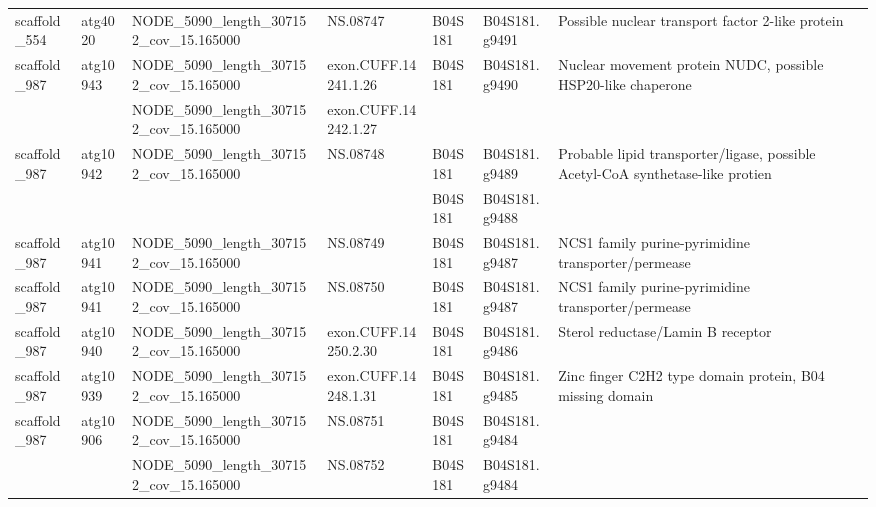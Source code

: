 \begin{longtable}{lllllll}
   scaffold\_554 &   atg4020 &   NODE\_5090\_length\_307152\_cov\_15.165000 &              NS.08747 &      B04S181 &   B04S181.g9491 &                                Possible nuclear transport factor 2-like protein \\
   scaffold\_987 &  atg10943 &   NODE\_5090\_length\_307152\_cov\_15.165000 &  exon.CUFF.14241.1.26 &      B04S181 &   B04S181.g9490 &                    Nuclear movement protein NUDC, possible HSP20-like chaperone \\
                &           &    NODE\_5090\_length\_307152\_cov\_15.165000 &  exon.CUFF.14242.1.27 &              &                 &                                                                                 \\
   scaffold\_987 &  atg10942 &   NODE\_5090\_length\_307152\_cov\_15.165000 &              NS.08748 &      B04S181 &   B04S181.g9489 &  Probable lipid transporter/ligase, possible Acetyl-CoA synthetase-like protien \\
                &           &                                              &                       &      B04S181 &   B04S181.g9488 &                                                                                 \\
   scaffold\_987 &  atg10941 &   NODE\_5090\_length\_307152\_cov\_15.165000 &              NS.08749 &      B04S181 &   B04S181.g9487 &                              NCS1 family purine-pyrimidine transporter/permease \\
   scaffold\_987 &  atg10941 &   NODE\_5090\_length\_307152\_cov\_15.165000 &              NS.08750 &      B04S181 &   B04S181.g9487 &                              NCS1 family purine-pyrimidine transporter/permease \\
   scaffold\_987 &  atg10940 &   NODE\_5090\_length\_307152\_cov\_15.165000 &  exon.CUFF.14250.2.30 &      B04S181 &   B04S181.g9486 &                                               Sterol reductase/Lamin B receptor \\
   scaffold\_987 &  atg10939 &   NODE\_5090\_length\_307152\_cov\_15.165000 &  exon.CUFF.14248.1.31 &      B04S181 &   B04S181.g9485 &                        Zinc finger C2H2 type domain protein, B04 missing domain \\
   scaffold\_987 &  atg10906 &   NODE\_5090\_length\_307152\_cov\_15.165000 &              NS.08751 &      B04S181 &   B04S181.g9484 &                                                                                 \\
                &           &   NODE\_5090\_length\_307152\_cov\_15.165000 &              NS.08752 &      B04S181 &   B04S181.g9484 &                                                                                 \\
\end{longtable}
